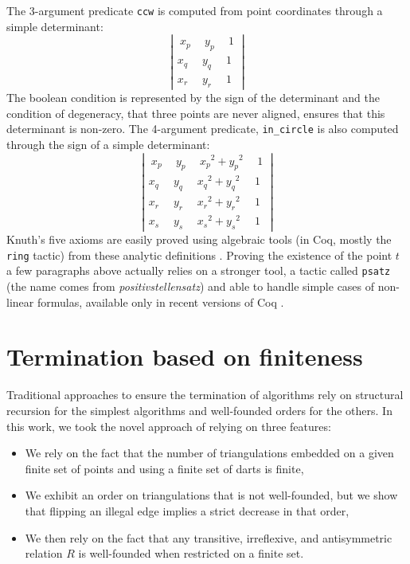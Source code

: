 \documentclass{llncs}
\begin{document}
The 3-argument predicate {\tt ccw} is computed from
point coordinates through a simple determinant:
\[\left|\begin{array}{ccc}~x_p~&~y_p~&~1~\\x_q&y_q&1\\x_r&y_r&1\end{array}\right|\]
The boolean condition is represented by the sign of the determinant and the
condition of degeneracy, that three points are never aligned, ensures that
this determinant is non-zero.  The 4-argument predicate, {\tt in\_circle}
is also computed through the sign of a simple determinant:
\[\left|\begin{array}{cccc}~x_p~&~y_p~&~{x_p}^2 + {y_p}^2~& ~1~\\
  x_q&y_q&{x_q}^2 + {y_q}^2& 1\\
  x_r&y_r&{x_r}^2 + {y_r}^2& 1\\
  x_s&y_s&{x_s}^2 + {y_s}^2& 1\end{array}\right|\] 
Knuth's five axioms are easily proved using algebraic tools (in Coq,
mostly the {\tt ring} tactic) from these analytic definitions
\cite{knu,pic:ber}.  Proving the existence of the point \(t\) a few
paragraphs above actually relies on a stronger tool, a tactic called
{\tt psatz} (the name comes from {\em positivstellensatz})
and able to handle simple cases of non-linear formulas,
available only in recent versions of Coq \cite{bes06}.

\section{Termination based on finiteness}
\label{TF}
Traditional approaches to ensure the termination of algorithms rely on
structural recursion for the simplest algorithms and well-founded orders for
the others.  In this work, we took the novel approach of relying on three
features:
\begin{itemize}
\item We rely on the fact that the number of triangulations embedded on a
  given finite set of points and using a finite set of darts is finite,
\item We exhibit an order on triangulations that is not well-founded,
  but we show that flipping an illegal edge implies a strict decrease
  in that order,
\item We then rely on the fact that any transitive, irreflexive, and
antisymmetric relation \(R\) is well-founded when restricted on a finite set.
\end{itemize}
\end{document}
